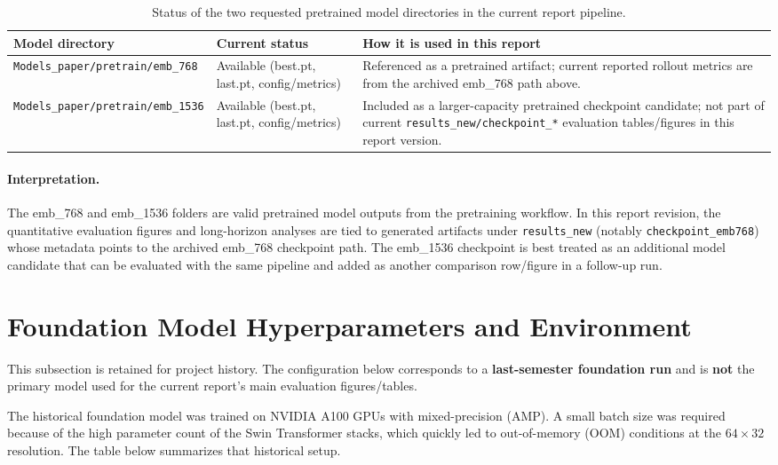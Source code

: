 \documentclass[12pt]{report}
\begin{document}
\begin{table}[H]
\centering
\caption{Status of the two requested pretrained model directories in the current report pipeline.}
\begin{tabular}{p{}p{}p{}}
\hline
\textbf{Model directory} & \textbf{Current status} & \textbf{How it is used in this report} \\
\hline
\texttt{Models\_paper/pretrain/emb\_768} & Available (best.pt, last.pt, config/metrics) & Referenced as a pretrained artifact; current reported rollout metrics are from the archived emb\_768 path above. \\
\texttt{Models\_paper/pretrain/emb\_1536} & Available (best.pt, last.pt, config/metrics) & Included as a larger-capacity pretrained checkpoint candidate; not part of current \texttt{results\_new/checkpoint\_*} evaluation tables/figures in this report version. \\
\hline
\end{tabular}
\end{table}

\paragraph{Interpretation.}
The emb\_768 and emb\_1536 folders are valid pretrained model outputs from the pretraining workflow. In this report revision, the quantitative evaluation figures and long-horizon analyses are tied to generated artifacts under \texttt{results\_new} (notably \texttt{checkpoint\_emb768}) whose metadata points to the archived emb\_768 checkpoint path. The emb\_1536 checkpoint is best treated as an additional model candidate that can be evaluated with the same pipeline and added as another comparison row/figure in a follow-up run.

\section{Foundation Model Hyperparameters and Environment}

This subsection is retained for project history. The configuration below corresponds to a \textbf{last-semester foundation run} and is \textbf{not} the primary model used for the current report's main evaluation figures/tables.

The historical foundation model was trained on NVIDIA A100 GPUs with mixed-precision (AMP). 
A small batch size was required because of the high parameter count of the Swin Transformer stacks, which quickly led to out-of-memory (OOM) conditions at the $64\times32$ resolution. 
The table below summarizes that historical setup.
\end{document}
